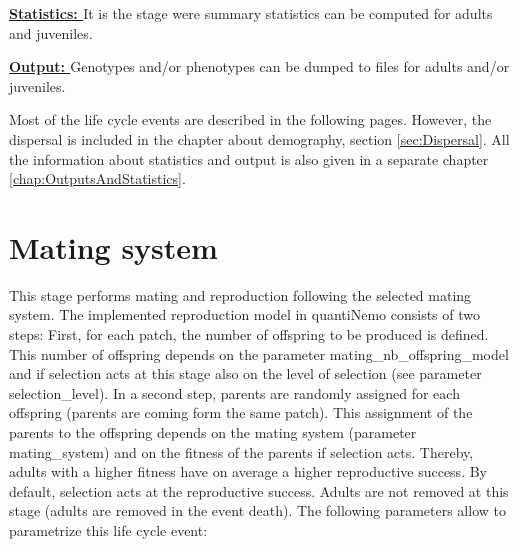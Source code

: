 \documentclass[letterpaper,12pt,oneside]{book}
\begin{document}
\begin{description}
\item \textbf{\hyperref[sec:SummaryStatistics]{Statistics: }} It is the stage were summary statistics can be computed for adults and juveniles.
\item \textbf{\hyperref[sec:RawData]{Output: }} Genotypes and/or phenotypes can be dumped to files for adults and/or juveniles.
\end{description}
Most of the life cycle events are described in the following pages. However, the dispersal is included in the chapter about demography,  section \ref{sec:Dispersal}. All the information about statistics and output is also given in a separate chapter \ref{chap:OutputsAndStatistics}.


\section{Mating system}\label{sec:MatingSystem}
This stage performs mating and reproduction following the selected mating system. The implemented reproduction model in quantiNemo consists of two steps: First, for each patch, the number of offspring to be produced is defined. This number of offspring depends on the parameter \textsf{mating\_nb\_offspring\_model} and if selection acts at this stage also on the level of selection (see parameter \textsf{selection\_level}). In a second step, parents are randomly assigned for each offspring (parents are coming form the same patch). This assignment of the parents to the offspring depends on the mating system (parameter \textsf{mating\_system}) and on the fitness of the parents if selection acts. Thereby, adults with a higher fitness have on average a higher reproductive success. By default, selection acts at the reproductive success. Adults are not removed at this stage (adults are removed in the event \textsf{death}). The following parameters allow to parametrize this life cycle event:
 
\end{document}
